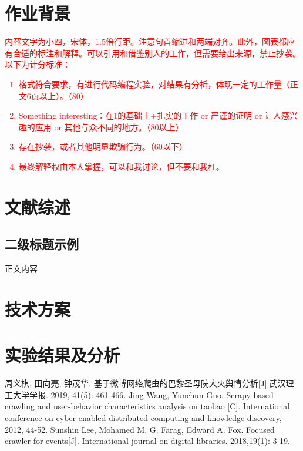 \documentclass{homework-thesis}
\begin{document}
    \makecover
    \section{作业背景}
    {
        \bfseries\textcolor{red}{
            内容文字为小四，宋体，1.5倍行距。注意句首缩进和两端对齐。此外，图表都应有合适的标注和解释。可以引用和借鉴别人的工作，但需要给出来源，禁止抄袭。以下为计分标准：
            \begin{enumerate}
                \item 格式符合要求，有进行代码编程实验，对结果有分析，体现一定的工作量（正文6页以上）。（80）
                \item Something interesting：在1的基础上+扎实的工作 or 严谨的证明 or 让人感兴趣的应用 or 其他与众不同的地方。（80以上）
                \item 存在抄袭，或者其他明显欺骗行为。（60以下）
                \item 最终解释权由本人掌握，可以和我讨论，但不要和我杠。
            \end{enumerate}
        }
    }
    \section{文献综述} 
	\subsection{二级标题示例}
    正文内容
    \section{技术方案}
    \section{实验结果及分析}
    \begin{thebibliography}{99} %
         周义棋, 田向亮, 钟茂华. 基于微博网络爬虫的巴黎圣母院大火舆情分析[J].武汉理工大学学报. 2019, 41(5): 461-466.
         Jing Wang, Yunchun Guo. Scrapy-based crawling and user-behavior characteristics analysis on taobao [C]. International conference on cyber-enabled distributed computing and knowledge discovery, 2012, 44-52.
         Sunshin Lee, Mohamed M. G. Farag, Edward A. Fox. Focused crawler for events[J]. International journal on digital libraries. 2018,19(1): 3-19.
    \end{thebibliography}
\end{document}
